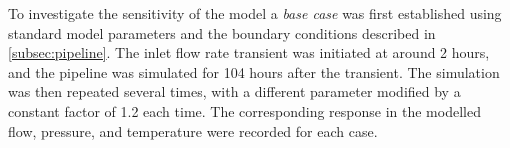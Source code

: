 
To investigate the sensitivity of the model a \emph{base case} was first established using standard model parameters and the boundary conditions described in \cref{subsec:pipeline}. The inlet flow rate transient was initiated at around 2 hours, and the pipeline was simulated for 104 hours after the transient.
%
The simulation was then repeated several times, with a different parameter modified by a constant factor of 1.2 each time. The corresponding response in the modelled flow, pressure, and temperature were recorded for each case. 

